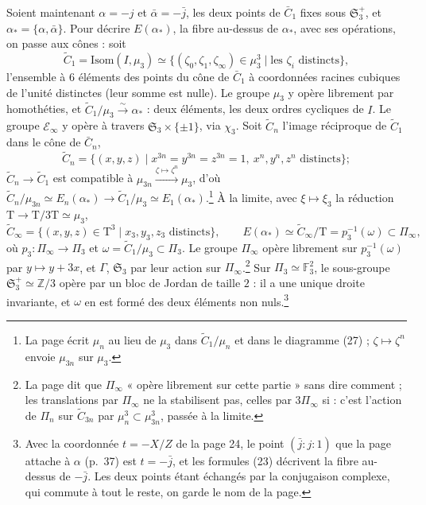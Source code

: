 \documentclass[11pt,a4paper]{article}
\begin{document}
Soient maintenant $\alpha = -j$ et $\bar{\alpha} = -\bar{j}$, les deux points de
$\bar{C}_{1}$ fixes sous $\mathfrak{S}_{3}^{+}$, et $\alpha_{*} = \{\alpha,
\bar{\alpha}\}$. Pour décrire $E(\alpha_{*})$, la fibre au-dessus de
$\alpha_{*}$, avec ses opérations, on passe aux cônes : soit
\[
\widetilde{C}_{1} = \mathrm{Isom}(I, \mu_{3}) \simeq \{(\zeta_{0}, \zeta_{1},
\zeta_{\infty}) \in \mu_{3}^{3} \mid \text{les } \zeta_{i} \text{ distincts}\},
\]
l'ensemble à $6$ éléments des points du cône de $\bar{C}_{1}$ à coordonnées
racines cubiques de l'unité distinctes (leur somme est nulle). Le groupe
$\mu_{3}$ y opère librement par homothéties, et $\widetilde{C}_{1}/\mu_{3}
\xrightarrow{\sim} \alpha_{*}$ : deux éléments, les deux ordres cycliques de
$I$. Le groupe $\mathcal{E}_{\infty}$ y opère à travers $\mathfrak{S}_{3}
\times \{\pm 1\}$, via $\chi_{3}$. Soit $\widetilde{C}_{n}$ l'image réciproque de
$\widetilde{C}_{1}$ dans le cône de $\bar{C}_{n}$,
\[
\widetilde{C}_{n} = \{(x, y, z) \mid x^{3n} = y^{3n} = z^{3n} = 1,\ x^{n}, y^{n},
z^{n} \text{ distincts}\} ;
\]
$\widetilde{C}_{n} \to \widetilde{C}_{1}$ est compatible à $\mu_{3n}
\xrightarrow{\zeta \mapsto \zeta^{n}} \mu_{3}$, d'où $\widetilde{C}_{n}/\mu_{3n}
\simeq E_{n}(\alpha_{*}) \to \widetilde{C}_{1}/\mu_{3} \simeq
E_{1}(\alpha_{*})$.\footnote{La page écrit $\mu_{n}$ au lieu de $\mu_{3}$ dans
$\widetilde{C}_{1}/\mu_{n}$ et dans le diagramme (27) ; $\zeta \mapsto
\zeta^{n}$ envoie $\mu_{3n}$ sur $\mu_{3}$.} À la limite, avec $\xi \mapsto
\xi_{3}$ la réduction $\mathrm{T} \to \mathrm{T}/3\mathrm{T} \simeq \mu_{3}$,
\[
\widetilde{C}_{\infty} = \{(x, y, z) \in \mathrm{T}^{3} \mid x_{3}, y_{3}, z_{3}
\text{ distincts}\}, \qquad
E(\alpha_{*}) \simeq \widetilde{C}_{\infty}/\mathrm{T} = p_{3}^{-1}(\omega)
\subset \Pi_{\infty},
\]
où $p_{3} : \Pi_{\infty} \to \Pi_{3}$ et $\omega = \widetilde{C}_{1}/\mu_{3}
\subset \Pi_{3}$. Le groupe $\Pi_{\infty}$ opère librement sur
$p_{3}^{-1}(\omega)$ par $y \mapsto y + 3x$, et $\Gamma$, $\mathfrak{S}_{3}$ par
leur action sur $\Pi_{\infty}$.\footnote{La page dit que $\Pi_{\infty}$ « opère
librement sur cette partie » sans dire comment ; les translations par
$\Pi_{\infty}$ ne la stabilisent pas, celles par $3\Pi_{\infty}$ si : c'est
l'action de $\Pi_{n}$ sur $\widetilde{C}_{3n}$ par $\mu_{n}^{3} \subset
\mu_{3n}^{3}$, passée à la limite.} Sur $\Pi_{3} \simeq \mathbb{F}_{3}^{2}$, le
sous-groupe $\mathfrak{S}_{3}^{+} \simeq \mathbb{Z}/3$ opère par un bloc de
Jordan de taille $2$ : il a une unique droite invariante, et $\omega$ en est
formé des deux éléments non nuls.\footnote{Avec la coordonnée $t = -X/Z$ de la
page 24, le point $(\bar{j} : j : 1)$ que la page attache à $\alpha$ (p.~37)
est $t = -\bar{j}$, et les formules (23) décrivent la fibre au-dessus de
$-\bar{j}$. Les deux points étant échangés par la conjugaison complexe, qui
commute à tout le reste, on garde le nom de la page.}
\end{document}
